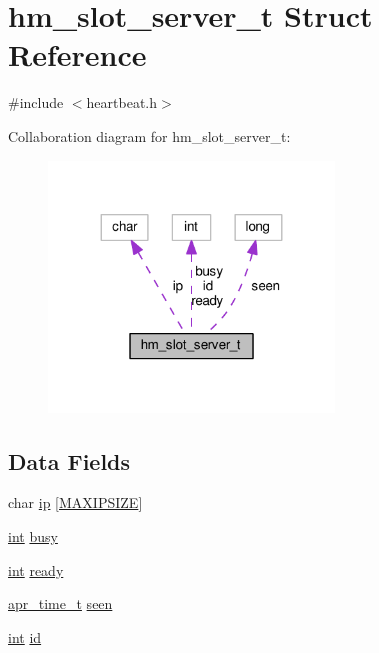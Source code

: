 \hypertarget{structhm__slot__server__t}{}\section{hm\+\_\+slot\+\_\+server\+\_\+t Struct Reference}
\label{structhm__slot__server__t}


{\ttfamily \#include $<$heartbeat.\+h$>$}



Collaboration diagram for hm\+\_\+slot\+\_\+server\+\_\+t\+:
\nopagebreak
\begin{figure}[H]
\begin{center}
\leavevmode
\includegraphics[width=215pt]{structhm__slot__server__t__coll__graph}
\end{center}
\end{figure}
\subsection*{Data Fields}
\begin{DoxyCompactItemize}
\item 
char \hyperlink{structhm__slot__server__t_a8226e2190c174090074ea9fbc4475fe2}{ip} \mbox{[}\hyperlink{group__HEARTBEAT_gae192505cd9047f7280229eac4742b18c}{M\+A\+X\+I\+P\+S\+I\+ZE}\mbox{]}
\item 
\hyperlink{pcre_8txt_a42dfa4ff673c82d8efe7144098fbc198}{int} \hyperlink{structhm__slot__server__t_a26581e2e47175d8b6e6544d5bf905fa4}{busy}
\item 
\hyperlink{pcre_8txt_a42dfa4ff673c82d8efe7144098fbc198}{int} \hyperlink{structhm__slot__server__t_a72e8293ce402437580d315789f943671}{ready}
\item 
\hyperlink{group__apr__time_gadb4bde16055748190eae190c55aa02bb}{apr\+\_\+time\+\_\+t} \hyperlink{structhm__slot__server__t_a8d1a3cff3e4aa8dc54e118b335ca0716}{seen}
\item 
\hyperlink{pcre_8txt_a42dfa4ff673c82d8efe7144098fbc198}{int} \hyperlink{structhm__slot__server__t_a347643408aeb1569c3f597693e5adc61}{id}
\end{DoxyCompactItemize}


